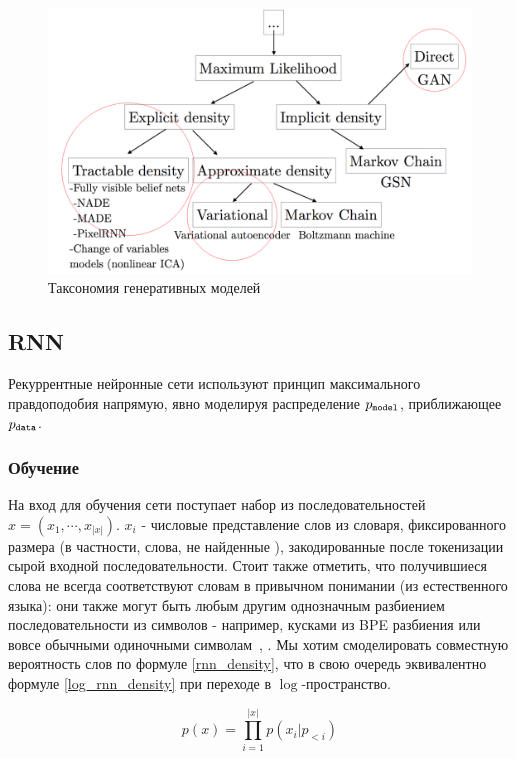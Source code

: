 \documentclass{spbau-diploma}
\begin{document}
\begin{figure}[h]
\centering
\includegraphics[width=\textwidth]{images/gen_taxonomy2.png}
\caption{Таксономия генеративных моделей}
\label{gen_taxonomy2}
\end{figure}

\subsection{RNN}
Рекуррентные нейронные сети используют принцип максимального правдоподобия 
напрямую, явно моделируя распределение $p_{\texttt{model}}$, приближающее $p_{\texttt{data}}$. 

\subsubsection{Обучение}
На вход для обучения сети поступает набор из последовательностей 
$x = (x_1, \cdots, x_{|x|})$. $x_i$ - числовые представление слов из словаря,
фиксированного размера (в частности, слова, не найденные ), закодированные 
после токенизации \cite{wiki:token} сырой входной последовательности. Стоит
также отметить, что получившиеся слова не всегда соответствуют словам в 
привычном понимании (из естественного языка): они также могут быть любым другим
однозначным разбиением последовательности из символов - например, кусками из BPE
разбиения или вовсе обычными одиночными символам~\cite{1508.07909}, 
\cite{charnn}. Мы хотим
смоделировать совместную вероятность слов по формуле \ref{rnn_density}, что
в свою очередь эквивалентно формуле \ref{log_rnn_density} при переходе в 
$\log$-пространство.

\begin{equation}
\label{rnn_density}
p(x) = \prod^{|x|}_{i=1}{p(x_i | p_{<i})}
\end{equation}
\end{document}
